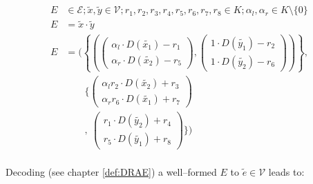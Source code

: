 \begin{align*}
  E & \in \mathcal{E}; \widetilde{x}, \widetilde{y} \in \mathcal{V};
  r_1, r_2, r_3, r_4, r_5, r_6, r_7, r_8 \in K;
  \alpha_l, \alpha_r \in K \setminus \{0\} \\
  E & = \widetilde{x} \cdot \widetilde{y} \\
  E & = \Bigg(\left\{\left(
            \begin{pmatrix}
              \alpha_l \cdot D(\widetilde{x_1}) - r_1 \\
              \alpha_r \cdot D(\widetilde{x_2}) - r_5
            \end{pmatrix},
            \begin{pmatrix}
              1        \cdot D(\widetilde{y_1}) - r_2 \\
              1        \cdot D(\widetilde{y_2}) - r_6
            \end{pmatrix}
        \right)\right\}, \\
    &   \qquad\bigg\{
        \begin{pmatrix}
            \alpha_lr_2 \cdot D(\widetilde{x_2}) + r_3 \\
            \alpha_rr_6 \cdot D(\widetilde{x_1}) + r_7
          \end{pmatrix} \\
    &  \qquad,
        \ \begin{pmatrix}
            r_1        \cdot D(\widetilde{y_2}) + r_4 \\
            r_5        \cdot D(\widetilde{y_1}) + r_8
          \end{pmatrix}
        \bigg\}\Bigg) \\
\end{align*}

Decoding (see chapter \ref{def:DRAE}) a well--formed $E$ to
$\widetilde{e} \in \mathcal{V}$ leads to:

